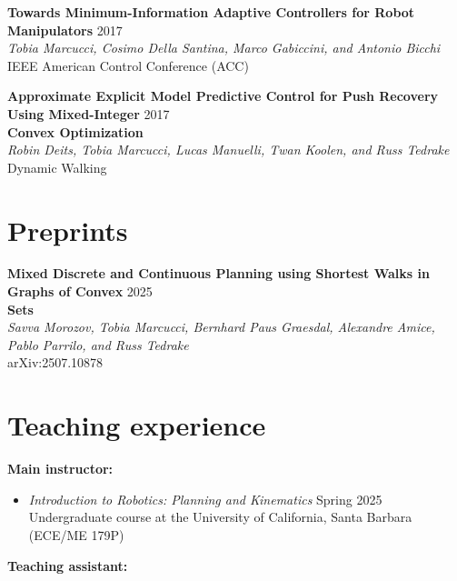 \documentclass[11pt,a4paper,sans]{moderncv}
\begin{document}
\begin{enumerate}[label={[C\arabic*]}]
\item \textbf{Towards Minimum-Information Adaptive Controllers for Robot Manipulators} \hfill 2017 \\
\textit{Tobia Marcucci, Cosimo Della Santina, Marco Gabiccini, and Antonio Bicchi} \\
IEEE American Control Conference (ACC)
 
\item \textbf{Approximate Explicit Model Predictive Control for Push Recovery Using Mixed-Integer} \hfill 2017 \\ \textbf{Convex Optimization} \\
\textit{Robin Deits, Tobia Marcucci, Lucas Manuelli, Twan Koolen, and Russ Tedrake} \\
Dynamic Walking

\end{enumerate}

\section{Preprints}

\begin{enumerate}[label={[P\arabic*]}]
	
\item \textbf{Mixed Discrete and Continuous Planning using Shortest Walks in Graphs of Convex} \hfill 2025 \\ \textbf{Sets} \\
\textit{Savva Morozov, Tobia Marcucci, Bernhard Paus Graesdal, Alexandre Amice, Pablo Parrilo, and Russ Tedrake} \\
arXiv:2507.10878

\end{enumerate}

\section{Teaching experience}

\textbf{Main instructor:}

\begin{itemize}
\item \textit{Introduction to Robotics: Planning and Kinematics} \hfill Spring 2025 \\
Undergraduate course at the University of California, Santa Barbara (ECE/ME 179P)
\end{itemize}

\textbf{Teaching assistant:}
\end{document}
